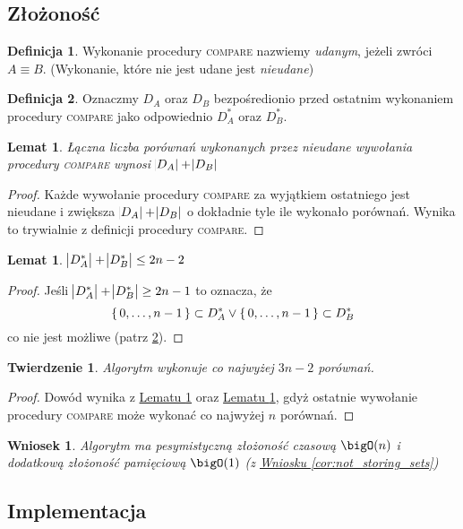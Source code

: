 \documentclass{scrartcl}
\theoremstyle{definition}
\theoremstyle{plain}
\theoremstyle{remark}
\theoremstyle{plain}
\theoremstyle{definition}
\newtheorem{def_success_compare}{Definicja}[section]
\newtheorem{def_D_star}[def_success_compare]{Definicja}
\theoremstyle{plain}
\newtheorem{lemma_unsuccesful_comparisons}
[lemma_equiv_if_lex_min_eq]{Lemat}
\newtheorem{lemma_d_star_len}[lemma_equiv_if_lex_min_eq]{Lemat}
\newtheorem{complexity_theorem}[termination_theorem]{Twierdzenie}
\newtheorem{o_complexity}[not_storing_sets]{Wniosek}
\begin{document}
\subsection{Złożoność}
\begin{def_success_compare}
	\label{def:success_compare}
	Wykonanie procedury \textnormal{\textsc{compare}}
	nazwiemy \emph{udanym}, jeżeli zwróci \(A\equiv B\).
	(Wykonanie, które nie jest udane jest \emph{nieudane})
\end{def_success_compare}
\begin{def_D_star}
	\label{def:D_star}
	Oznaczmy \(D_A\) oraz \(D_B\)
	bezpośredionio przed ostatnim wykonaniem
	procedury \textnormal{\textsc{compare}}
	jako odpowiednio \(D_A^*\) oraz \(D_B^*\).
\end{def_D_star}
\begin{lemma_unsuccesful_comparisons}
	\label{lem:unsuccesful_comparisons}
	Łączna liczba porównań wykonanych przez
	nieudane wywołania procedury
	\textnormal{\textsc{compare}}
	wynosi \(\abs{D_A}+\abs{D_B}\)
\end{lemma_unsuccesful_comparisons}
\begin{proof}
	Każde wywołanie procedury \textsc{compare}
	za wyjątkiem ostatniego jest nieudane
	i zwiększa \(\abs{D_A}+\abs{D_B}\)
	o dokładnie tyle ile wykonało porównań.
	Wynika to trywialnie z definicji
	procedury \textsc{compare}.
\end{proof}
\begin{lemma_d_star_len}
	\label{lem:d_star_len}
	\(\abs{D_A^*}+\abs{D_B^*}\leq2n-2\)
\end{lemma_d_star_len}
\begin{proof}
	Jeśli \(\abs{D_A^*}+\abs{D_B^*}\ge2n-1\)
	to oznacza, że
	\[\set{0,\dots,n-1}\subset D_A^* \lor
		\set{0,\dots,n-1}\subset D_B^*\]
	co nie jest możliwe (patrz \cref{def:D_star}).
\end{proof}
\begin{complexity_theorem}
	Algorytm wykonuje co najwyżej \(3n-2\) porównań.
\end{complexity_theorem}
\begin{proof}
	Dowód wynika z
	\hyperref[lem:unsuccesful_comparisons]
	{Lematu \ref*{lem:unsuccesful_comparisons}}
	oraz
	\hyperref[lem:d_star_len]{Lematu \ref*{lem:d_star_len}},
	gdyż ostatnie wywołanie procedury \textsc{compare}
	może wykonać co najwyżej \(n\) porównań.
\end{proof}
\begin{o_complexity}
	Algorytm ma pesymistyczną złożoność czasową \(\bigO(n)\)
	i dodatkową złożoność pamięciową \(\bigO(1)\)%
	(z \hyperref[cor:not_storing_sets]
	{Wniosku \ref*{cor:not_storing_sets}})
\end{o_complexity}
\pagebreak
\subsection{Implementacja}
\pagebreak
\printbibliography[heading=bibintoc]
\end{document}
